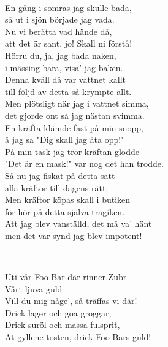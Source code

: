 \newpage


 \\       
\author{Text: Martin Johnsson}

\songtext{}En gång i somras jag skulle bada, \\
så ut i sjön började jag vada. \\
Nu vi berätta vad hände då,\\
att det är sant, jo! Skall ni förstå!\\
Hörru du, ja, jag bada naken,\\
i mässing bara, visa' jag baken.\\
Denna kväll då var vattnet kallt\\
till följd av detta så krympte allt.\\
Men plötsligt när jag i vattnet simma,\\
det gjorde ont så jag nästan svimma.\\
En kräfta klämde fast på min snopp,\\
å jag sa "Dig skall jag äta opp!"\\
På min task jag tror kräftan glodde\\
"Det är en mask!" var nog det han trodde.\\
Så nu jag fiskat på detta sätt\\
alla kräftor till dagens rätt.\\
Men kräftor köpas skall i butiken\\
för hör på detta själva tragiken.\\
Att jag blev vanställd, det må va' hänt\\
men det var synd jag blev impotent!


\newpage

 \\       
\author{Text: Britney}

\songtext{} 
Uti vår Foo Bar där rinner Zubr\\
Vårt ljuva guld\\
Vill du mig någe', så träffas vi där!\\
Drick lager och goa groggar,\\
Drick suröl och massa fulsprit,\\
Ät gyllene tosten, drick Foo Bars guld!

